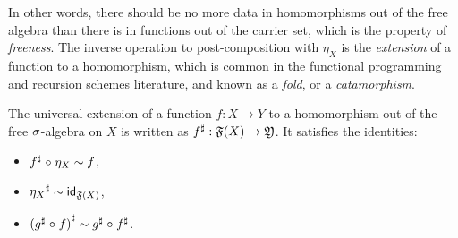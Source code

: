 %
In other words, there should be no more data in homomorphisms out of the free algebra than there is in functions out of
the carrier set, which is the property of \emph{freeness}.
%
The inverse operation to post-composition with $\eta_X$ is the \emph{extension} of a function to a homomorphism,
which is common in the functional programming and recursion schemes literature, and known as a \emph{fold},
or a \emph{catamorphism}.
%
\begin{definition}
    \label{def:universal-extension}
    The universal extension of a function $f : X \to Y$ to a homomorphism out of the free $\sigma$-algebra on $X$ is written
    as ${f}^{\sharp} : \mathfrak{F}(X) \to \mathfrak{Y}$.
    It satisfies the identities:
    \begin{itemize}
        \item ${f}^{\sharp} \mathrel{\circ} \eta_X \mathrel{\sim} f$,
        \item ${\eta_{X}}^{\sharp} \mathrel{\sim} \operatorname{\mathsf{id}}_{\mathfrak{F}(X)}$,
        \item ${({g}^{\sharp} \mathrel{\circ} f)}^{\sharp} \mathrel{\sim} {g}^{\sharp} \mathrel{\circ} {f}^{\sharp}$.
    \end{itemize}
\end{definition}

